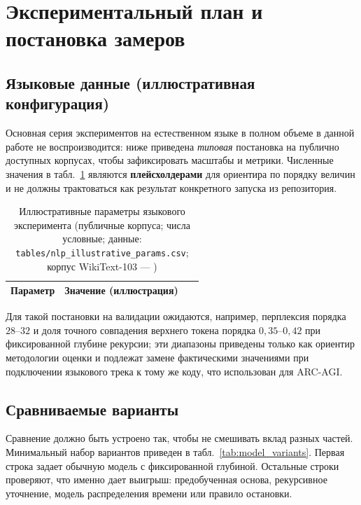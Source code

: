 \section{Экспериментальный план и постановка замеров}

%
\newcommand{\NlpTabRows}{}%
\DTLforeach*{nlpparams}{\prm=param,\vl=colvalue}{%
  \eappto\NlpTabRows{\expandonce{\prm} & \expandonce{\vl}\\}%
}%

\subsection{Языковые данные (иллюстративная конфигурация)}

Основная серия экспериментов на естественном языке в полном объеме в данной работе не воспроизводится: ниже приведена \emph{типовая} постановка на публично доступных корпусах, чтобы зафиксировать масштабы и метрики. Численные значения в табл.~\ref{tab:main_params} являются \textbf{плейсхолдерами} для ориентира по порядку величин и не должны трактоваться как результат конкретного запуска из репозитория.

\begin{table}[H]
\centering
\caption{Иллюстративные параметры языкового эксперимента (публичные корпуса; числа условные; данные: \texttt{tables/nlp\_illustrative\_params.csv}; корпус WikiText-103 --- \cite{merity2016})}
\label{tab:main_params}
\begin{tabular}{l p{0.72\linewidth}}
\toprule
Параметр & Значение (иллюстрация) \\
\midrule
\NlpTabRows
\bottomrule
\end{tabular}
\end{table}

Для такой постановки на валидации ожидаются, например, перплексия порядка \(28\)--\(32\) и доля точного совпадения верхнего токена порядка \(0{,}35\)--\(0{,}42\) при фиксированной глубине рекурсии; эти диапазоны приведены только как ориентир методологии оценки и подлежат замене фактическими значениями при подключении языкового трека к тому же коду, что использован для ARC-AGI.

\subsection{Сравниваемые варианты}

Сравнение должно быть устроено так, чтобы не смешивать вклад разных частей. Минимальный набор вариантов приведен в табл.~\ref{tab:model_variants}. Первая строка задает обычную модель с фиксированной глубиной. Остальные строки проверяют, что именно дает выигрыш: предобученная основа, рекурсивное уточнение, модель распределения времени или правило остановки.

